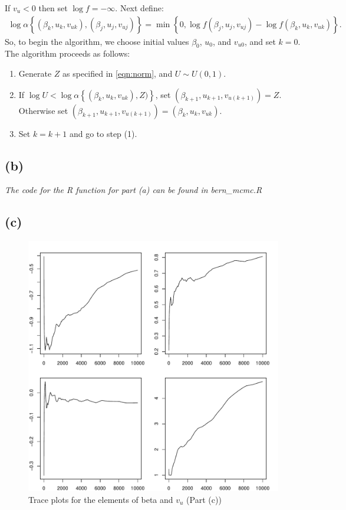 \documentclass{article}\usepackage[]{graphicx}\usepackage[]{color}
\makeatletter
\def\maxwidth{ %
  \ifdim\Gin@nat@width>\linewidth
    \linewidth
  \else
    \Gin@nat@width
  \fi
}
\newenvironment{knitrout}{}{} %
\newcommand{\lb}{\left\{}
\newcommand{\rb}{\right\}}
\makeatother
\begin{document}
If $v_u<0$ then set $\log f = -\infty$.  Next define:
\begin{equation*}
\begin{split}
  \log\alpha\lb(\beta_k,u_k,v_{uk}),(\beta_j,u_j,v_{uj})\rb = \min\lb 0, \log f (\beta_j,u_j,v_{uj}) - \log f (\beta_k,u_k,v_{uk})  \rb.
\end{split}
\end{equation*}
So, to begin the algorithm, we choose initial values $\beta_0$, $u_0$, and $v_{u0}$, and set $k=0$.  The algorithm proceeds as follows:
\begin{enumerate}
  \item Generate $Z$ as specified in \ref{eqn:norm}, and $U\sim U(0,1)$.
  \item If $\log U < \log\alpha\lb(\beta_k,u_k,v_{uk}),Z)\rb$, set $(\beta_{k+1},u_{k+1},v_{u(k+1)}) = Z$. Otherwise set $(\beta_{k+1},u_{k+1},v_{u(k+1)}) = (\beta_k,u_k,v_{uk})$.
  \item Set $k=k+1$ and go to step (1).
\end{enumerate}

\subsection*{(b)}
\emph{The code for the R function for part (a) can be found in bern\_mcmc.R}

\subsection*{(c)}
\begin{knitrout}
\color{fgcolor}\begin{figure}
\includegraphics[width=\maxwidth]{figure/trace1-1} \caption[Trace plots for the elements of beta and ]{Trace plots for the elements of beta and $v_u$ (Part (c))}\label{fig:trace1}
\end{figure}


\end{knitrout}
\end{document}
